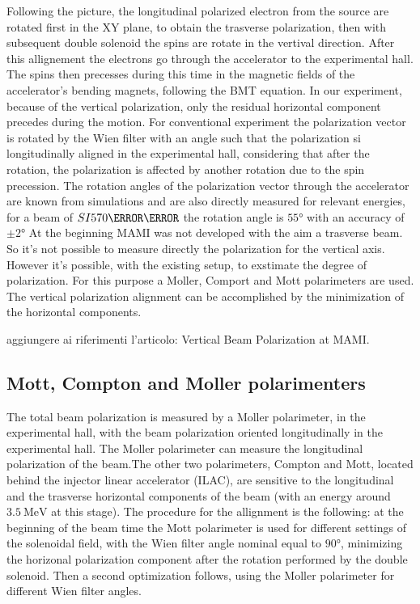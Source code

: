 Following the picture, the longitudinal polarized electron from the source are rotated first in the XY plane, to obtain the trasverse polarization, then with subsequent double solenoid the spins are rotate in the vertival direction. 
After this allignement the electrons go through the accelerator to the experimental hall. The spins then precesses during this time in the magnetic fields of the accelerator's bending magnets, following the BMT equation.
In our experiment, because of the vertical polarization, only the residual horizontal component precedes during the motion. For conventional experiment the polarization vector is rotated by the Wien filter with an angle such that the polarization si longitudinally aligned in the experimental hall, considering that after the rotation, the polarization is affected by another rotation due to the spin precession. The rotation angles of the polarization vector through the accelerator are known from simulations and are also directly measured for relevant energies, for a beam of $SI{570}{ \mega \electronvolt}$ the rotation angle is $\ang{55}$ with an accuracy of $\pm \ang{2}$
At the beginning MAMI was not developed with the aim a trasverse beam. So it's not possible to measure directly the polarization for the vertical axis. However it's possible, with the existing setup, to exstimate the degree of polarization. For this purpose a Moller, Comport and Mott polarimeters are used. The vertical polarization alignment can be accomplished by the minimization of the horizontal components. 

\newline
aggiungere ai riferimenti l'articolo: Vertical Beam Polarization at MAMI. 

\subsection{Mott, Compton and Moller polarimenters}

The total beam polarization is measured by a Moller polarimeter, in the experimental hall, with the beam polarization oriented longitudinally in the experimental hall. The Moller polarimeter can measure the longitudinal polarization of the beam.The other two polarimeters, Compton and Mott, located behind the injector linear accelerator (ILAC), are sensitive to the longitudinal and the trasverse horizontal components of the beam (with an energy around $\SI{3.5}{\mega \electronvolt}$ at this stage). The procedure for the allignment is the following: at the beginning of the beam time the Mott polarimeter is used for different settings of the solenoidal field, with the Wien filter angle nominal equal to $\ang{90}$, minimizing the horizonal polarization component after the rotation performed by the double solenoid. Then a second optimization follows, using the Moller polarimeter for different Wien filter angles. 

